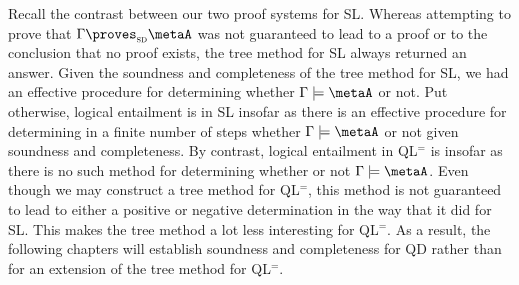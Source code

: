 Recall the contrast between our two proof systems for SL.
Whereas attempting to prove that $\Gamma \proves_{\textsc{sd}} \metaA$ was not guaranteed to lead to a proof or to the conclusion that no proof exists, the tree method for SL always returned an answer. 
Given the soundness and completeness of the tree method for SL, we had an effective procedure for determining whether $\Gamma\models\metaA$ or not. 
Put otherwise, logical entailment is  in SL insofar as there is an effective procedure for determining in a finite number of steps whether $\Gamma \models \metaA$ or not given soundness and completeness.
By contrast, logical entailment in QL$^=$ is  insofar as there is no such method for determining whether or not $\Gamma \models \metaA$.
Even though we may construct a tree method for QL$^=$, this method is not guaranteed to lead to either a positive or negative determination in the way that it did for SL.
This makes the tree method a lot less interesting for QL$^=$.
As a result, the following chapters will establish soundness and completeness for QD rather than for an extension of the tree method for QL$^=$.



\iffalse

\practiceproblems

